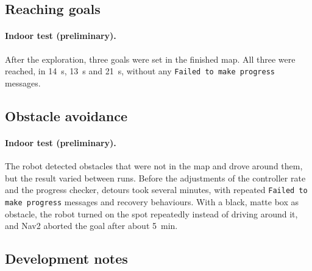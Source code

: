 
\subsection{Reaching goals}

\paragraph{Indoor test (preliminary).} After the exploration, three goals were set in the finished map. All three were reached, in \SI{14}{\second}, \SI{13}{\second} and \SI{21}{\second}, without any \texttt{Failed to make progress} messages.


\subsection{Obstacle avoidance}

\paragraph{Indoor test (preliminary).} The robot detected obstacles that were not in the map and drove around them, but the result varied between runs. Before the adjustments of the controller rate and the progress checker, detours took several minutes, with repeated \texttt{Failed to make progress} messages and recovery behaviours. With a black, matte box as obstacle, the robot turned on the spot repeatedly instead of driving around it, and Nav2 aborted the goal after about \SI{5}{\minute}.


\subsection{Development notes}

